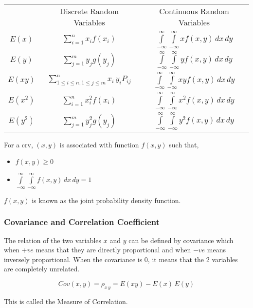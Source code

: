 \documentclass[./EngineeringMaths.tex]{subfiles}
\begin{document}
\begin{center}
{\renewcommand{\arraystretch}{2}
\begin{tabular}{c|c|c|}
\cline{2-3}
& Discrete Random Variables & Continuous Random Variables \\
\cline{2-3}
\multicolumn{1}{c|}{$E(x)$} & $\sum\limits_{i=1}^n x_i f(x_i)$ &  $\int\limits_{-\infty}^\infty\int\limits_{-\infty}^\infty x f(x,y) \, dx\,dy $ \\
\cline{2-3}
\multicolumn{1}{c|}{$E(y)$} & $\sum\limits_{j=1}^m y_j g(y_j)$ &  $\int\limits_{-\infty}^\infty\int\limits_{-\infty}^\infty y f(x,y) \, dx\,dy $ \\
\cline{2-3}
\multicolumn{1}{c|}{$E(xy)$} & $\sum\limits_{1\leq i\leq n,1\leq j\leq m}^n x_i\,y_i P_{ij}$ &  $\int\limits_{-\infty}^\infty\int\limits_{-\infty}^\infty xy f(x,y) \, dx\,dy $ \\
\cline{2-3}
\multicolumn{1}{c|}{$E(x^2)$} & $\sum\limits_{i=1}^n x_i^2 f(x_i)$ &  $\int\limits_{-\infty}^\infty\int\limits_{-\infty}^\infty x^2 f(x,y) \, dx\,dy $ \\
\cline{2-3}
\multicolumn{1}{c|}{$E(y^2)$} & $\sum\limits_{j=1}^m y_j^2 g(y_j)$ &  $\int\limits_{-\infty}^\infty\int\limits_{-\infty}^\infty y^2 f(x,y) \, dx\,dy $ \\
\cline{2-3}
\end{tabular}}
\end{center}

For a crv, $(x,y)$ is associated with function $f(x,y)$ such that,
\begin{itemize}
\item $f(x,y) \geq 0$
\item $\int\limits_{-\infty}^\infty\int\limits_{-\infty}^\infty f(x,y) \,dx\,dy = 1$
\end{itemize}
$f(x,y)$ is known as the joint probability density function.

\subsubsection{Covariance and Correlation Coefficient}
The relation of the two variables $x$ and $y$ can be defined by covariance which when $+ve$ means that they are directly proportional and when $-ve$ means inversely proportional. When the covariance is 0, it means that the 2 variables are completely unrelated.

$$Cov(x,y) = \rho_{x\,y} = E(xy) - E(x)\,E(y)$$

This is called the Measure of Correlation.
\end{document}
